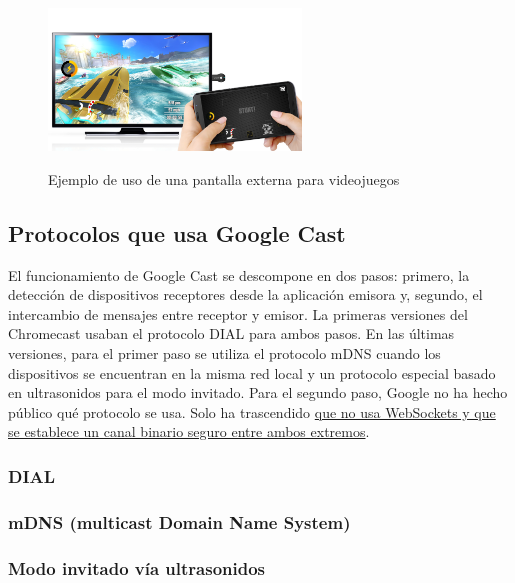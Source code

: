 \begin{figure}[h]
	\centering
	\includegraphics[width=0.6\textwidth]{./Imagenes/gameexample.jpg}
	\label{fig:fondo}
	\caption{Ejemplo de uso de una pantalla externa para videojuegos}
\end{figure}


\subsection{Protocolos que usa Google Cast}

El funcionamiento de Google Cast se descompone en dos pasos: primero, la detección de dispositivos receptores desde la aplicación emisora y, segundo, el intercambio de mensajes entre receptor y emisor.
La primeras versiones del Chromecast usaban el protocolo DIAL para ambos pasos.
En las últimas versiones, para el primer paso se utiliza el protocolo mDNS cuando los dispositivos se encuentran en la misma red local y un protocolo especial basado en ultrasonidos para el modo invitado. Para el segundo paso, Google no ha hecho público qué protocolo se usa. Solo ha trascendido \href{https://plus.google.com/116723992087294619013/posts/d6TLN4S8mrH}{que no usa WebSockets y que se establece un canal binario seguro entre ambos extremos}.

\subsubsection{DIAL}


\subsubsection{mDNS (multicast Domain Name System)}


\subsubsection{Modo invitado vía ultrasonidos}

